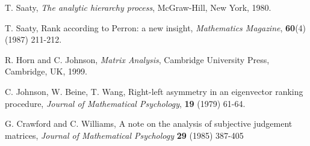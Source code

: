 \documentclass[a4,11pt,twoside,leqno]{report}
\theoremstyle{definition}
\theoremstyle{remark}
\numberwithin{equation}{section}
\begin{document}
\begin{thebibliography}{1}

   T. Saaty, {\em The analytic hierarchy process}, McGraw-Hill, New York, 1980. 
  
   T. Saaty, Rank according to Perron: a new insight, {\em Mathematics Magazine}, {\bf 60}(4) (1987) 211-212.

   R. Horn and C. Johnson, {\em Matrix Analysis}, Cambridge University Press, Cambridge, UK, 1999.

   C. Johnson, W. Beine, T. Wang, Right-left asymmetry in an eigenvector ranking procedure, {\em Journal of Mathematical Psychology}, {\bf 19} (1979) 61-64.
  
   G. Crawford and C. Williams, A note on the analysis of subjective judgement matrices, {\em Journal of Mathematical Psychology} {\bf 29} (1985) 387-405
  
  
  
  
  
  
   
  




  \end{thebibliography}
\end{document}
